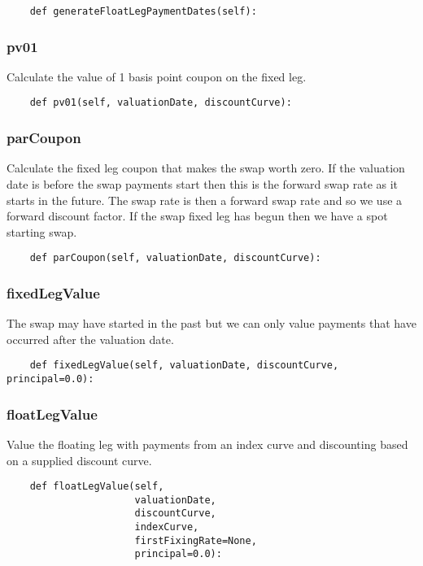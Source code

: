 \documentclass[twoside,11pt]{book}
\begin{document}
\begin{lstlisting}
    def generateFloatLegPaymentDates(self):
\end{lstlisting}

\subsubsection*{{\bf pv01}}
Calculate the value of 1 basis point coupon on the fixed leg.  

\begin{lstlisting}
    def pv01(self, valuationDate, discountCurve):
\end{lstlisting}

\subsubsection*{{\bf parCoupon}}
Calculate the fixed leg coupon that makes the swap worth zero.  If the valuation date is before the swap payments start then this  is the forward swap rate as it starts in the future. The swap rate  is then a forward swap rate and so we use a forward discount  factor. If the swap fixed leg has begun then we have a spot  starting swap.  

\begin{lstlisting}
    def parCoupon(self, valuationDate, discountCurve):
\end{lstlisting}

\subsubsection*{{\bf fixedLegValue}}
The swap may have started in the past but we can only value payments that have occurred after the valuation date.  

\begin{lstlisting}
    def fixedLegValue(self, valuationDate, discountCurve, principal=0.0):
\end{lstlisting}

\subsubsection*{{\bf floatLegValue}}
Value the floating leg with payments from an index curve and discounting based on a supplied discount curve.  

\begin{lstlisting}
    def floatLegValue(self,
                      valuationDate,
                      discountCurve,
                      indexCurve,
                      firstFixingRate=None,
                      principal=0.0):
\end{lstlisting}
\end{document}
